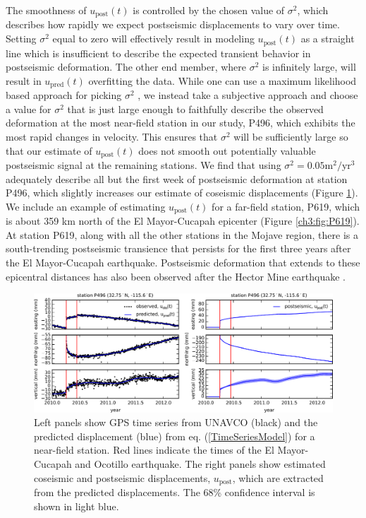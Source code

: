 The smoothness of $u_\mathrm{post}(t)$ is controlled by the chosen value of $\sigma^2$, which describes how rapidly we expect postseismic displacements to vary over time.  Setting $\sigma^2$ equal to zero will effectively result in modeling $u_\mathrm{post}(t)$ as a straight line which is insufficient to describe the expected transient behavior in postseismic deformation. The other end member, where $\sigma^2$ is infinitely large, will result in $u_\mathrm{pred}(t)$ overfitting the data. While one can use a maximum likelihood based approach for picking $\sigma^2$ \citep[e.g.][]{Segall1997}, we instead take a subjective approach and choose a value for $\sigma^2$ that is just large enough to faithfully describe the observed deformation at the most near-field station in our study, P496, which exhibits the most rapid changes in velocity. This ensures that $\sigma^2$ will be sufficiently large so that our estimate of $u_\mathrm{post}(t)$ does not smooth out potentially valuable postseismic signal at the remaining stations. We find that using $\sigma^2 = 0.05 \mathrm{m}^2 / \mathrm{yr}^3$ adequately describe all but the first week of postseismic deformation at station P496, which slightly increases our estimate of coseismic displacements (Figure \ref{ch3:fig:P496}).  We include an example of estimating $u_\mathrm{post}(t)$ for a far-field station, P619, which is about 359 km north of the El Mayor-Cucapah epicenter (Figure \ref{ch3:fig:P619}).  At station P619, along with all the other stations in the Mojave region, there is a south-trending postseismic transience that persists for the first three years after the El Mayor-Cucapah earthquake.  Postseismic deformation that extends to these epicentral distances has also been observed after the Hector Mine earthquake \citep{Freed2007a}.

\begin{figure}\label{ch3:fig:P496}
\includegraphics[scale=1.0]{ch3/figures/2016jb013114-p02}
\caption{Left panels show GPS time series from UNAVCO (black) and the predicted displacement (blue) from eq. (\ref{TimeSeriesModel}) for a near-field station.  Red lines indicate the times of the El Mayor-Cucapah and Ocotillo earthquake. The right panels show estimated coseismic and postseismic displacements, $u_\mathrm{post}$, which are extracted from the predicted displacements.  The 68\% confidence interval is shown in light blue.}
\end{figure}

